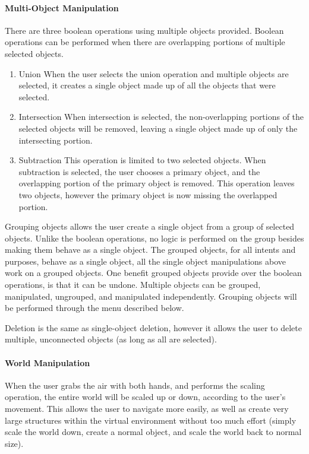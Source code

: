 \paragraph{Multi-Object Manipulation}
There are three boolean operations using multiple objects provided.  Boolean operations can be performed when there are overlapping portions of multiple selected objects.
\begin{enumerate}
	\item Union
	\subitem When the user selects the union operation and multiple objects are selected, it creates a single object made up of all the objects that were selected.
	\item Intersection
	\subitem When intersection is selected, the non-overlapping portions of the selected objects will be removed, leaving a single object made up of only the intersecting portion.
	\item Subtraction
	\subitem This operation is limited to two selected objects.  When subtraction is selected, the user chooses a primary object, and the overlapping portion of the primary object is removed.  This operation leaves two objects, however the primary object is now missing the overlapped portion.
\end{enumerate}

Grouping objects allows the user create a single object from a group of selected objects.
Unlike the boolean operations, no logic is performed on the group besides making them behave as a single object.
The grouped objects, for all intents and purposes, behave as a single object, all the single object manipulations above work on a grouped objects.
One benefit grouped objects provide over the boolean operations, is that it can be undone.
Multiple objects can be grouped, manipulated, ungrouped, and manipulated independently.
Grouping objects will be performed through the menu described below.

Deletion is the same as single-object deletion, however it allows the user to delete multiple, unconnected objects (as long as all are selected).

\paragraph{World Manipulation}
When the user grabs the air with both hands, and performs the scaling operation, the entire world will be scaled up or down, according to the user's movement.
This allows the user to navigate more easily, as well as create very large structures within the virtual environment without too much effort (simply scale the world down, create a normal object, and scale the world back to normal size).

